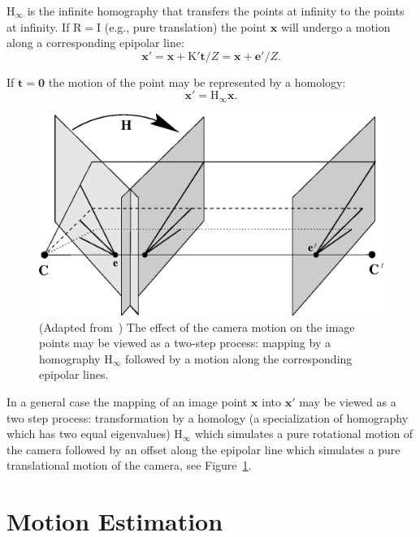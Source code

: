 \documentclass{report}
\begin{document}
$\mathrm{H_\infty}$ is the infinite homography that transfers the
points at infinity to the points at infinity.  If $\mathrm{R = I}$
(e.g., pure translation) the point $\mathbf{x}$ will undergo a motion
along a corresponding epipolar line:
\begin{equation}
\mathbf{x}' = \mathbf{x}+ \mathrm{K'}\mathbf{t}/Z = \mathbf{x}+\mathbf{e}'/Z.
\end{equation}

If $\mathbf{t} = \mathbf{0}$ the motion of the point may be represented by a homology:
\begin{equation}
\mathbf{x}' = \mathrm{H_\infty}\mathbf{x}.
\end{equation}

\begin{figure}[h]
  \centering
  \includegraphics[scale=.5]{fig89}
  \caption{(Adapted from~\cite{Hartley2004}) The effect of the camera motion on
    the image points may be viewed as a two-step process: mapping by a
    homography $\mathrm{H_\infty}$ followed by a motion along the corresponding
    epipolar lines.}
  \label{fig:two_step_motion}
\end{figure}

In a general case the mapping of an image point $\mathbf{x}$ into
$\mathbf{x}'$ may be viewed as a two step process: transformation by a
homology (a specialization of homography which has two equal
eigenvalues) $\mathrm{H_\infty}$ which simulates a pure rotational
motion of the camera followed by an offset along the epipolar line
which simulates a pure translational motion of the camera, see Figure~\ref{fig:two_step_motion}.

\section{Motion Estimation}\label{sec:moest}
\end{document}
